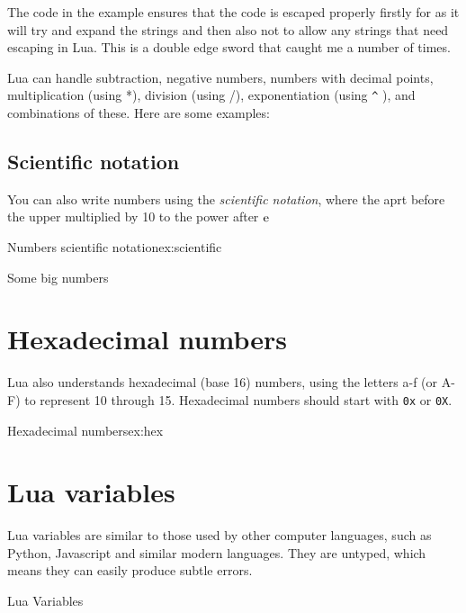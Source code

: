 The code in the example ensures that the code is escaped properly firstly for \tex as it will try and expand the
strings and then also not to allow any strings that need escaping in Lua. This is a double edge sword that caught me a number of times.


Lua can handle subtraction, negative numbers, numbers with decimal points, multiplication (using *),
division (using /), exponentiation (using \texttt{\^} ), and combinations of these. Here are some examples:


\subsection{Scientific notation}

You can also write numbers using the \textit{scientific notation}, where the aprt before the upper multiplied by 10 to the power after $\textup{e}$

\begin{texexample}{Numbers scientific notation}{ex:scientific}

Some big numbers 

\end{texexample}


\section{Hexadecimal numbers}
Lua also understands hexadecimal (base 16) numbers, using the letters
a-f (or A-F) to represent 10 through 15. Hexadecimal numbers should start with \texttt{0x} or \texttt{0X}.

\begin{texexample}{Hexadecimal numbers}{ex:hex}
\end{texexample}


\section{Lua variables}
Lua variables are similar to those used by other computer languages, such as Python, Javascript and similar modern languages. They are untyped, which means they can easily produce subtle errors.

\begin{texexample}{Lua Variables}{}
\end{texexample}

